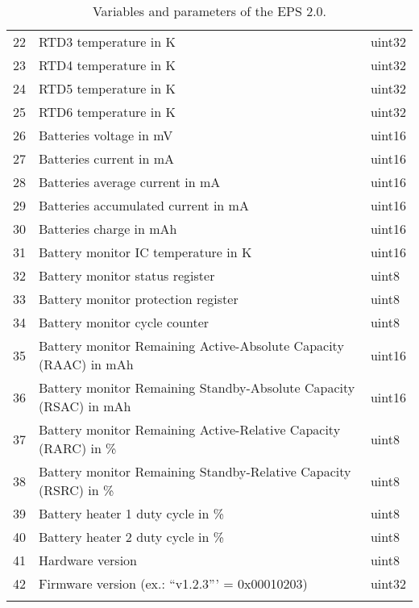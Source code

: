 \begin{longtable}[c]{cL{0.82\textwidth}l}
    22  & RTD3 temperature in K                                             & uint32 \\
    23  & RTD4 temperature in K                                             & uint32 \\
    24  & RTD5 temperature in K                                             & uint32 \\
    25  & RTD6 temperature in K                                             & uint32 \\
    26  & Batteries voltage in mV                                           & uint16 \\
    27  & Batteries current in mA                                           & uint16 \\
    28  & Batteries average current in mA                                   & uint16 \\
    29  & Batteries accumulated current in mA                               & uint16 \\
    30  & Batteries charge in mAh                                           & uint16 \\
    31  & Battery monitor IC temperature in K                               & uint16 \\
    32  & Battery monitor status register                                   & uint8 \\
    33  & Battery monitor protection register                               & uint8 \\
    34  & Battery monitor cycle counter                                     & uint8 \\
    35  & Battery monitor Remaining Active-Absolute Capacity (RAAC) in mAh  & uint16 \\
    36  & Battery monitor Remaining Standby-Absolute Capacity (RSAC) in mAh & uint16 \\
    37  & Battery monitor Remaining Active-Relative Capacity (RARC) in \%   & uint8 \\
    38  & Battery monitor Remaining Standby-Relative Capacity (RSRC) in \%  & uint8 \\
    39  & Battery heater 1 duty cycle in \%                                 & uint8 \\
    40  & Battery heater 2 duty cycle in \%                                 & uint8 \\
    41  & Hardware version                                                  & uint8 \\
    42  & Firmware version (ex.: ``v1.2.3''' = 0x00010203)                  & uint32 \\
    \bottomrule[1.5pt]
    \caption{Variables and parameters of the EPS 2.0.}
    \label{tab:eps2-variables}
\end{longtable}

